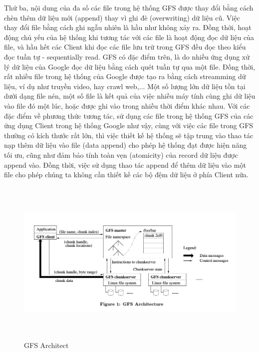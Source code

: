 \documentclass[a4paper, 10pt, conference]{IEEEconf}
\begin{document}
Thứ ba, nội dung của đa số các file trong hệ thống GFS được thay đổi bằng cách chèn thêm dữ liệu mới (append) thay vì ghi đè (overwriting) dữ liệu cũ. Việc thay đổi file bằng cách ghi ngẫu nhiên là hầu như không xảy ra. Đồng thời, hoạt động chủ yếu của hệ thống khi tương tác với các file là hoạt động đọc dữ liệu của file, và hầu hết các Client khi đọc các file lưu trữ trong GFS đều đọc theo kiểu đọc tuần tự - sequentially read. GFS có đặc điểm trên, là do nhiều ứng dụng xử lý dữ liệu của Google đọc dữ liệu bằng cách quét tuần tự qua một file. Đồng thời, rất nhiều file trong hệ thống của Google được tạo ra bằng cách streamming dữ liệu, ví dụ như truyền video, hay crawl web,... Một số lượng lớn dữ liệu tồn tại dưới dạng file nén, một số file là kết quả của việc nhiều máy tính cùng ghi dữ liệu vào file đó một lúc, hoặc được ghi vào trong nhiều thời điểm khác nhau. Với các đặc điểm về phương thức tương tác, sử dụng các file trong hệ thống GFS của các ứng dụng Client trong hệ thống Google như vậy, cùng với việc các file trong GFS thường có kích thước rất lớn, thì việc thiết kế hệ thống sẽ tập trung vào thao tác nạp thêm dữ liệu vào file (data append) cho phép hệ thống đạt được hiện năng tối ưu, cũng như đảm bảo tính toàn vẹn (atomicity) của record dữ liệu được append vào. Đồng thời, việc sử dụng thao tác append để thêm dữ liệu vào một file cho phép chúng ta không cần thiết kế các bộ đệm dữ liệu ở phía Client nữa.
\begin{figure}
  \includegraphics[width=\textwidth,height=8cm]{GFS-Architecture.png}
  \caption{GFS Architect}
\end{figure}
\end{document}
